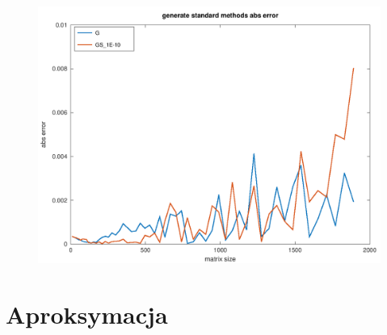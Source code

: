 \documentclass[10pt]{article}
\begin{document}
\begin{figure}[h]
\includegraphics[scale=0.45]{plots/06_gen_abs_error_standard_methods.png}
\end{figure}

\section{Aproksymacja}
\end{document}
